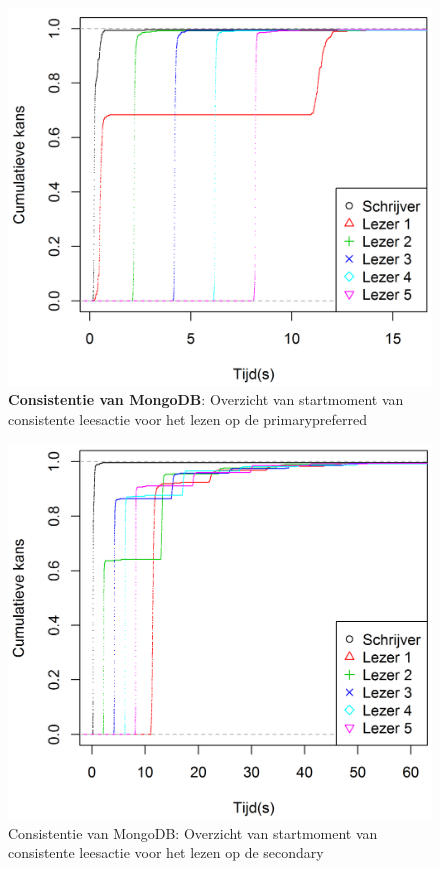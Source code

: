 \begin{figure}[htb!] 
	\centering
	\includegraphics[width=.70\textwidth]{img/Observaties/MongoDB/ECDF-plot-Start-updateRawData-majority-primarypreferred-1}
	\caption{\textbf{Consistentie van MongoDB}: Overzicht van startmoment van consistente leesactie voor het lezen op de primarypreferred }
	\label{fig:consistentie-mongodb-primarypreferred}
\end{figure}
\begin{figure}[htb!] 
	\centering
	\includegraphics[width=.70\textwidth]{img/Observaties/MongoDB/ECDF-plot-Start-updateRawData-majority-secondary-1}
	\caption{Consistentie van MongoDB: Overzicht van startmoment van consistente leesactie voor het lezen op de secondary }
	\label{fig:consistentie-mongodb-secondary}
\end{figure}
